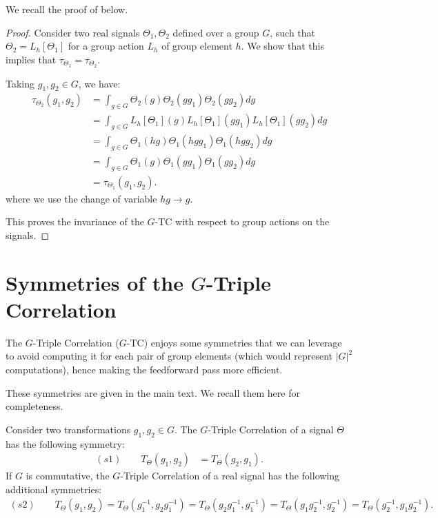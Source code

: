 We recall the proof of \cite{KakaralaTriple} below.

\begin{proof}
Consider two real signals $\Theta_1, \Theta_2$ defined over a group $G$, such that $\Theta_2 = L_h[\Theta_1]$ for a group action $L_h$ of group element $h$. We show that this implies that $\tau_{\Theta_1} = \tau_{\Theta_2}$.

Taking $g_1, g_2 \in G$, we have:
\begin{align*}
    \tau_{\Theta_2}(g_1, g_2)
        &= \int_{g \in G}
            \Theta_2(g) \Theta_2\left(gg_1\right) \Theta_2\left(gg_2\right) dg  \\
        &= \int_{g \in G}
            L_h[\Theta_1](g) L_h[\Theta_1]\left(gg_1\right) L_h[\Theta_1]\left(gg_2\right) dg  \\
        &= \int_{g \in G}
            \Theta_1(hg) \Theta_1\left(hgg_1\right) \Theta_1\left(hgg_2\right) dg  \\
        &= \int_{g \in G}
            \Theta_1(g) \Theta_1\left(gg_1\right) \Theta_1\left(gg_2\right) dg \\
        &=  \tau_{\Theta_1}(g_1, g_2).
\end{align*}
where we use the change of variable $hg \rightarrow g$.

This proves the invariance of the $G$-TC with respect to group actions on the signals.
\end{proof}

\section{Symmetries of the $G$-Triple Correlation}\label{app:symmetries}

The $G$-Triple Correlation ($G$-TC) enjoys some symmetries that we can leverage to avoid computing it for each pair of group elements (which would represent $|G|^2$ computations), hence making the feedforward pass more efficient.

These symmetries are given in the main text. We recall them here for completeness.

\begin{proposition}
Consider two transformations $g_1, g_2 \in G$. The $G$-Triple Correlation of a signal $\Theta$ has the following symmetry:
\begin{align*}
     (s1) \qquad T_\Theta(g_1, g_2) &= T_\Theta(g_2, g_1).
\end{align*}
If $G$ is commutative, the $G$-Triple Correlation of a real signal has the following additional symmetries:
\begin{align*}
     (s2) \qquad T_\Theta(g_1, g_2)
     = T_\Theta(g^{-1}_1, g_2g^{-1}_1)
     = T_\Theta(g_2g^{-1}_1, g^{-1}_1)
     = T_\Theta(g_1g^{-1}_2, g^{-1}_2)
     = T_\Theta(g^{-1}_2, g_1g^{-1}_2).
\end{align*}
\end{proposition}

